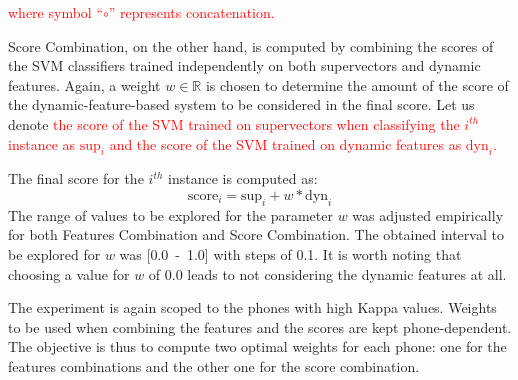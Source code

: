 \textcolor{red}{where symbol ``$\circ$'' represents concatenation.}

Score Combination, on the other hand, is computed by combining the scores
of the SVM classifiers trained independently on both supervectors and dynamic features.
Again, a weight $w \in \mathbb{R}$
is chosen to determine the amount of the score of the dynamic-feature-based system to be considered
in the final score. Let us denote
\textcolor{red}{
the score of the SVM trained on supervectors when classifying the $i^{th}$ instance
as $\text{sup}_{i}$ and the score of the SVM trained on dynamic features as
$\text{dyn}_{i}$.
}

The final score for the
$i^{th}$ instance is computed as:
\begin{equation}
	\text{score}_{i} = \text{sup}_{i} + w * \text{dyn}_{i}
\end{equation}
The range of values to be explored for the parameter $w$ was adjusted empirically for both
Features Combination and Score Combination. The obtained interval to be explored for $w$ was
\mbox{[0.0 - 1.0]} with steps of 0.1. It is worth noting that choosing
a value for $w$ of 0.0 leads to not considering the dynamic features at all.

The experiment is again scoped to the phones with high Kappa values.
Weights to be used when combining the features and the scores are kept phone-dependent.
The objective is thus to compute two optimal weights for each phone:
one for the features combinations and the other one for the score combination.



